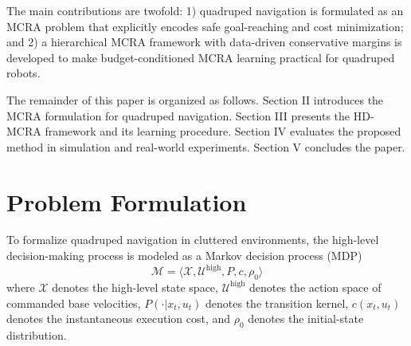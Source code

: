 \documentclass[conference]{IEEEtran}
\begin{document}
The main contributions are twofold: 1) quadruped navigation is formulated as an MCRA problem that explicitly encodes safe goal-reaching and cost minimization; and 2) a hierarchical MCRA framework with data-driven conservative margins is developed to make budget-conditioned MCRA learning practical for quadruped robots.

The remainder of this paper is organized as follows. Section II introduces the MCRA formulation for quadruped navigation. Section III presents the HD-MCRA framework and its learning procedure. Section IV evaluates the proposed method in simulation and real-world experiments. Section V concludes the paper.





















\section{Problem Formulation}
To formalize quadruped navigation in cluttered environments, the high-level decision-making process is modeled as a Markov decision process (MDP)
\begin{equation}
\mathcal{M}=\langle \mathcal{X}, \mathcal{U}^{\mathrm{high}}, P, c, \rho_0 \rangle
\end{equation}
where $\mathcal{X}$ denotes the high-level state space, $\mathcal{U}^{\mathrm{high}}$ denotes the action space of commanded base velocities, $P(\cdot|x_t,u_t)$ denotes the transition kernel, $c(x_t,u_t)$ denotes the instantaneous execution cost, and $\rho_0$ denotes the initial-state distribution.
\end{document}
